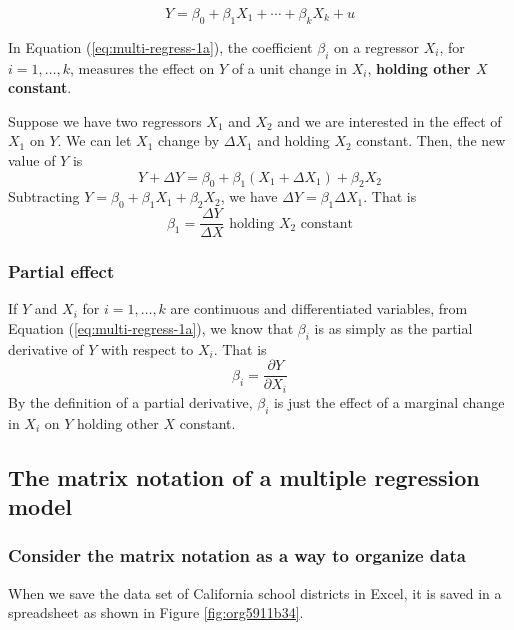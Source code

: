 \documentclass[a4paper,11pt]{article}
\begin{document}
\begin{equation}
\label{eq:multi-regress-1a}
Y = \beta_0 + \beta_1 X_1 + \cdots + \beta_k X_k + u
\end{equation}

In Equation (\ref{eq:multi-regress-1a}), the coefficient \(\beta_i\) on
a regressor \(X_i\), for \(i=1, \ldots, k\), measures the effect on \(Y\) of a
unit change in \(X_i\), \textbf{holding other \(X\) constant}. 

Suppose we have two regressors \(X_1\) and \(X_2\) and we are interested
in the effect of \(X_1\) on \(Y\). We can let \(X_1\) change by \(\Delta X_1\)
and holding \(X_2\) constant. Then, the new value of \(Y\) is
\[ 
Y + \Delta Y = \beta_0 + \beta_1 (X_1 + \Delta X_1) + \beta_2 X_2  
\]
Subtracting \(Y = \beta_0 + \beta_1 X_1 + \beta_2 X_2\), we have
\(\Delta Y = \beta_1 \Delta X_1\). That is
\[ \beta_1 = \frac{\Delta Y}{\Delta X} \text{ holding } X_2 \text{ constant} \]

\subsubsection*{Partial effect}
\label{sec:orgb1cc242}

If \(Y\) and \(X_i\) for \(i = 1, \ldots, k\) are continuous and
differentiated variables, from Equation (\ref{eq:multi-regress-1a}),
we know that \(\beta_i\) is as simply as the partial derivative of \(Y\) with
respect to \(X_i\). That is \[\beta_i = \frac{\partial Y}{\partial
X_i}\] By the definition of a partial derivative, \(\beta_i\) is just
the effect of a marginal change in \(X_i\) on \(Y\) holding other \(X\)
constant.


\subsection{The matrix notation of a multiple regression model}
\label{sec:orgcdac185}

\subsubsection*{Consider the matrix notation as a way to organize data}
\label{sec:org23cc383}

When we save the data set of California school districts in Excel, it
is saved in a spreadsheet as shown in Figure \ref{fig:org5911b34}.
\end{document}
